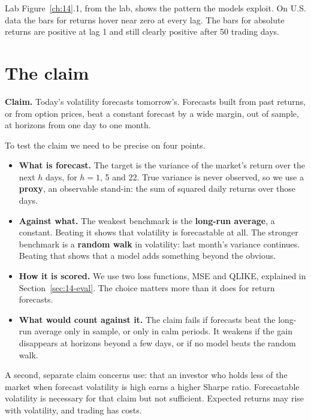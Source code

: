 Lab Figure~\ref{ch:14}.1, from the lab, shows the pattern the models exploit. On U.S. data the bars for returns hover near zero at every lag. The bars for absolute returns are positive at lag 1 and still clearly positive after 50 trading days.

\section{The claim}
\label{sec:14-claim}

\begin{callout}
\textbf{Claim.} Today's volatility forecasts tomorrow's. Forecasts built from past returns, or from option prices, beat a constant forecast by a wide margin, out of sample, at horizons from one day to one month.
\end{callout}

To test the claim we need to be precise on four points.

\begin{itemize}
  \item \textbf{What is forecast.} The target is the variance of the market's return over the next $h$ days, for $h = 1$, 5 and 22. True variance is never observed, so we use a \textbf{proxy}, an observable stand-in: the sum of squared daily returns over those days.
  \item \textbf{Against what.} The weakest benchmark is the \textbf{long-run average}, a constant. Beating it shows that volatility is forecastable at all. The stronger benchmark is a \textbf{random walk} in volatility: last month's variance continues. Beating that shows that a model adds something beyond the obvious.
  \item \textbf{How it is scored.} We use two loss functions, MSE and QLIKE, explained in Section~\ref{sec:14-eval}. The choice matters more than it does for return forecasts.
  \item \textbf{What would count against it.} The claim fails if forecasts beat the long-run average only in sample, or only in calm periods. It weakens if the gain disappears at horizons beyond a few days, or if no model beats the random walk.
\end{itemize}

A second, separate claim concerns use: that an investor who holds less of the market when forecast volatility is high earns a higher Sharpe ratio. Forecastable volatility is necessary for that claim but not sufficient. Expected returns may rise with volatility, and trading has costs.

